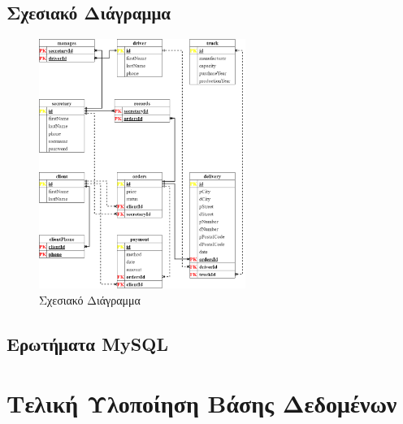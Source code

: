 \documentclass[12pt,a4paper, twoside, notitlepage]{report}
\begin{document}
\section{Σχεσιακό Διάγραμμα}
\begin{figure}[h]
  \centering
      \includegraphics[width=0.6\textwidth]{images/RS.png}
  \captionsetup{labelfont=bf}
  \caption{Σχεσιακό Διάγραμμα}
\end{figure}

\newpage
\section{Ερωτήματα \foreignlanguage{english}{MySQL}}



\newpage
\renewcommand{\chaptername}{Μέρος}
\chapter[Μέρος 3: Τελική Υλοποιήση Βάσης Δεδομένων]{Τελική Υλοποίηση Βάσης Δεδομένων}
\end{document}
